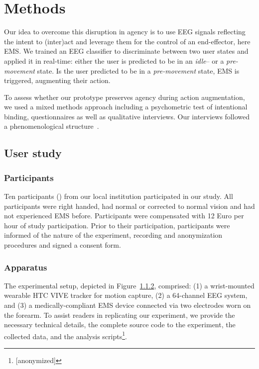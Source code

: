 
\section{Methods}


Our idea to overcome this disruption in agency is to use EEG signals reflecting the intent to (inter)act and leverage them for the control of an end-effector, here EMS. We trained an EEG classifier to discriminate between two user states and applied it in real-time: either the user is predicted to be in an \textit{idle}-- or a \textit{pre-movement} state. Is the user predicted to be in a \textit{pre-movement} state, EMS is triggered, augmenting their action.



To assess whether our prototype preserves agency during action augmentation, we used a mixed methods approach including a psychometric test of intentional binding, questionnaires as well as qualitative interviews. Our interviews followed a phenomenological structure~\citep{Danry2022-xk}.

\subsection{User study}

\subsubsection{Participants}

 Ten participants () from our local institution participated in our study. All participants were right handed, had normal or corrected to normal vision and had not experienced EMS before. Participants were compensated with 12 Euro per hour of study participation. Prior to their participation, participants were informed of the nature of the experiment, recording and anonymization procedures and signed a consent form.

\subsubsection{Apparatus}
The experimental setup, depicted in Figure~\ref{}, comprised: (1) a wrist-mounted wearable HTC VIVE tracker for motion capture, (2) a 64-channel EEG system, and (3) a medically-compliant EMS device connected via two electrodes worn on the forearm. To assist readers in replicating our experiment, we provide the necessary technical details, the complete source code to the experiment, the collected data, and the analysis scripts\footnote{[anonymized]}.

